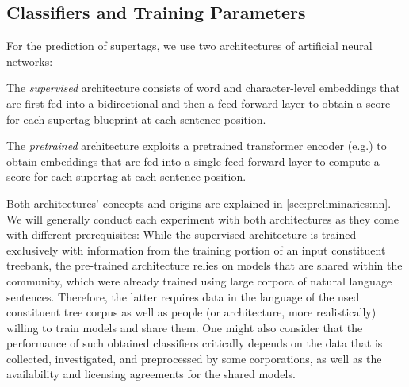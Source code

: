 \documentclass[../../document.tex]{subfiles}
\begin{document}
    \subsection{Classifiers and Training Parameters}
    For the prediction of supertags, we use two architectures of artificial neural networks:
    \begin{compactitem}
        \item The \emph{supervised} architecture consists of word and character-level embeddings that are first fed into a bidirectional  and then a feed-forward layer to obtain a score for each supertag blueprint at each sentence position.
        \item The \emph{pretrained} architecture exploits a pretrained transformer encoder (e.g.\@ {}) to obtain embeddings that are fed into a single feed-forward layer to compute a score for each supertag at each sentence position.
    \end{compactitem}
    Both architectures' concepts and origins are explained in \cref{sec:preliminaries:nn}.
    We will generally conduct each experiment with both architectures as they come with different prerequisites:
        While the supervised architecture is trained exclusively with information from the training portion of an input constituent treebank, the pre-trained architecture relies on models that are shared within the  community, which were already trained using large corpora of natural language sentences.
        Therefore, the latter requires data in the language of the used constituent tree corpus as well as people (or architecture, more realistically) willing to train models and share them.
        One might also consider that the performance of such obtained classifiers critically depends on the data that is collected, investigated, and preprocessed by some corporations, as well as the availability and licensing agreements for the shared models.
    
\end{document}
